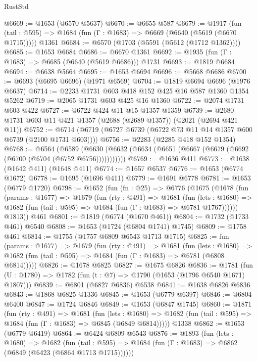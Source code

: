 \begin{lexlean}{RustStd}
\begin{coremodule}
{\begin{coremodule}
{{{{{{{{{{{{{{{{@6669 := @1653 (@6570 @5637)
@6670 := @6655 @587
@6679 := @1917
    (fun (tail : @595) => @1684 (fun (Γ : @1683) => @6669 (@6640 (@5619 (@6670 @1715)))))
    @1361
@6684 := @6570 (@1703 (@5591 (@5612 (@1712 @1362))))
@6685 := @1653 @6684
@6686 := @6670 @1361
@6692 := @1935 (fun (Γ : @1683) => @6685 (@6640 (@5619 @6686))) @1731
@6693 := @1819 @6684
@6694 := @6638 @5664
@6695 := @1653 @6694
@6696 := @5668 @6686
@6700 := @6693 (@6695 @6696) (@1971 @6569)
@6704 := @1819 @6694 @6696 (@1976 @6637)
@6714 := @2233 @1731 @603 @418 @152 @425 @16 @587 @1360 @1354 @5262
@6719 := @2065 @1731 @603 @425 @16 @1360
@6722 := @2074 @1731 @603 @422
@6727 := @6722 @424 @11 @15 @1357 @1359
@6739 := @2680 @1731 @603 @11 @421 @1357 (@2688 (@2689 @1357)) (@2021 (@2694 @421 @11))
@6752 := @6714 (@6719 (@6727 @6739 (@6722 @73 @11 @14 @1357 @600 @6739 (@2100 @1731 @603))))
@6756 := @2283 (@2285 @418 @152 @1354)
@6768 := @6564
    (@6589 (@6630 (@6632 (@6634 (@6651 (@6667 (@6679 (@6692 (@6700 (@6704 (@6752 @6756)))))))))))
@6769 := @1636 @411
@6773 := @1638 (@1642 @411) (@1648 @411)
@6774 := @1657 @6537
@6776 := @1653 (@6774 @1672)
@6778 := @1695 (@1696 @411)
@6779 := @1691 @6778
@6781 := @1653 (@6779 @1720)
@6798 := @1652
    (fun (fn : @25) =>
    @6776
      (@1675
        (@1678
          (fun (params : @1677) =>
          @1679
            (fun (rty : @491) =>
            @1681
              (fun (lets : @1680) =>
              @1682 (fun (tail : @595) => @1684 (fun (Γ : @1683) => @6781 @1767))))))
        @1813))
    @461
@6801 := @1819 (@6774 (@1670 @461))
@6804 := @1732 (@1733 @461) @6540
@6808 := @1653 (@1724 (@6804 @1741) @1745)
@6809 := @1758 @461
@6814 := @1755 (@1757 @6809 @6543 @1713 @1715)
@6825 := fun (params : @1677) =>
  @1679
    (fun (rty : @491) =>
    @1681
      (fun (lets : @1680) =>
      @1682 (fun (tail : @595) => @1684 (fun (Γ : @1683) => @6781 (@6808 @6814)))))
@6826 := @1678 @6825
@6827 := @1675 @6826
@6836 := @1781 (fun (U : @1780) => @1782 (fun (t : @7) => @1790 (@1653 (@1796 @6540 @1671) @1807)))
@6839 := @6801 (@6827 @6836) @6538
@6841 := @1638 @6826 @6836
@6843 := @1868 @6825 @1336
@6845 := @1653 (@6779 @6397)
@6846 := @6804 @6400
@6847 := @1724 @6846
@6849 := @1653 (@6847 @1745)
@6860 := @1871
    (fun (rty : @491) =>
    @1681
      (fun (lets : @1680) =>
      @1682 (fun (tail : @595) => @1684 (fun (Γ : @1683) => @6845 (@6849 @6814)))))
    @1338
@6862 := @1653 (@6779 @6419)
@6864 := @6424 @6809 @6543
@6876 := @1893
    (fun (lets : @1680) =>
    @1682
      (fun (tail : @595) => @1684 (fun (Γ : @1683) => @6862 (@6849 (@6423 (@6864 @1713 @1715))))))
}}}}}}}}}}}}}}}}
\end{coremodule}}
\end{coremodule}
\end{lexlean}
